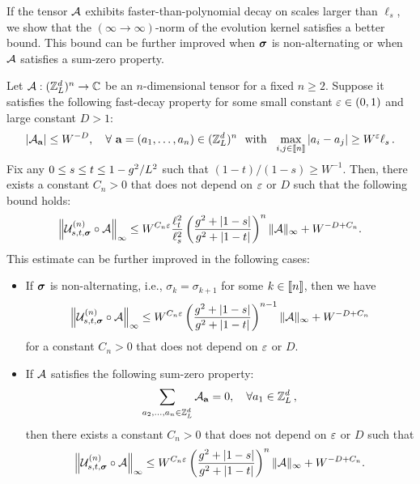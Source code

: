 If the tensor $\cal A$ exhibits faster-than-polynomial decay on scales larger than $\ell_s$, we show that the $({\infty \to \infty})$-norm of the evolution kernel  satisfies a better bound. This bound can be further improved when $\bsig$ is non-alternating or when $\cal A$ satisfies a sum-zero property.


\begin{lemma}\label{lem:sum_decay}
	Let ${\cal A}: (\Zn)^{n}\to \mathbb C$ be an $n$-dimensional tensor for a fixed $n\ge 2$. Suppose it satisfies the following fast-decay property for some small constant $\e\in(0,1)$ and large constant $D>1$:  
	\begin{equation}\label{deccA0}
	|\cal A_{\ba}|\le W^{-D}, \quad \forall\ \ba=(a_1,\ldots, a_n)\in (\Zn)^{n} \ \ \text{with}\ \	\max_{i,j\in \qqq{n}}|a_i-a_j|\ge W^{\e}\ell_s  \, .
	\end{equation}
	Fix any $0\le s \le t \le 1 -\ilambda^2/L^{2}$ such that $(1-t)/(1-s)\ge W^{-1}$. 
Then, there exists a constant $C_n>0$ that does not depend on $\e$ or $D$ such that the following bound holds:
	\begin{align}\label{sum_res_1}
		\left\|{\cal U}^{(n)}_{s,t,\bsig} \circ {\cal A}\right\|_\infty \le W^{C_n\e}\frac{\ell_t^2 }{\ell_s^2 }\p{\frac{\ilambda^2+|1-s|}{\ilambda^2+|1-t|}}^{n}\|{\cal A}\|_\infty
		+W^{-D+C_n} . %
	\end{align}
This estimate can be further improved in the following cases:

	\begin{itemize}
		\item[(I)] 
If $\bsig$ is non-alternating, i.e.,  $\sigma_k=\sigma_{k+1}$ for some $k\in \qqq{n}$, then we have
		\begin{align}\label{sum_res_2_NAL}
			 \left\|{\cal U}^{(n)}_{s,t,\bsig} \circ {\cal A}\right\|_\infty \le W^{C_n\e} \p{\frac{\ilambda^2+|1-s|}{\ilambda^2+|1-t|}}^{n-1}  \|{\cal A}\|_{\infty}  + W^{-D+C_n} %
			\end{align} 
		for a constant $C_n>0$ that does not depend on $\e$ or $D$.

\item[(II)] If ${\cal A}$ satisfies the following sum-zero property: 
		\begin{align}\label{sumAzero}
			\sum_{a_2,\ldots,a_n\in \Zn}{\cal A}_{\ba}=0, \quad \forall a_1\in \Zn \, ,
		\end{align}
then there exists a constant $C_n>0$ that does not depend on $\e$ or $D$ such that
		\begin{align}\label{sum_res_2}
			\left\|{\cal U}^{(n)}_{s,t,\bsig} \circ {\cal A}\right\|_\infty \le W^{C_n\e} \p{\frac{\ilambda^2+|1-s|}{\ilambda^2+|1-t|}}^{n} \|{\cal A}\|_{\infty} 
			+W^{-D+C_n}. 
		\end{align} 
\end{itemize}
\end{lemma} 
